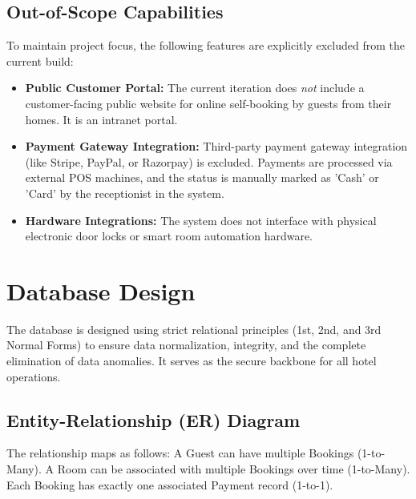 \documentclass[12pt,a4paper]{article}
\begin{document}
\subsection{Out-of-Scope Capabilities}
To maintain project focus, the following features are explicitly excluded from the current build:
\begin{itemize}
    \item \textbf{Public Customer Portal:} The current iteration does \textit{not} include a customer-facing public website for online self-booking by guests from their homes. It is an intranet portal.
    \item \textbf{Payment Gateway Integration:} Third-party payment gateway integration (like Stripe, PayPal, or Razorpay) is excluded. Payments are processed via external POS machines, and the status is manually marked as 'Cash' or 'Card' by the receptionist in the system.
    \item \textbf{Hardware Integrations:} The system does not interface with physical electronic door locks or smart room automation hardware.
\end{itemize}

\newpage
\section{Database Design}
The database is designed using strict relational principles (1st, 2nd, and 3rd Normal Forms) to ensure data normalization, integrity, and the complete elimination of data anomalies. It serves as the secure backbone for all hotel operations.

\subsection{Entity-Relationship (ER) Diagram}
The relationship maps as follows: A Guest can have multiple Bookings (1-to-Many). A Room can be associated with multiple Bookings over time (1-to-Many). Each Booking has exactly one associated Payment record (1-to-1).
\end{document}

